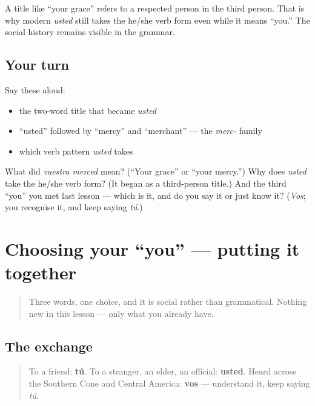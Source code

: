 \begin{culture}
A title like \textquotedblleft{}your grace\textquotedblright{} refers to a respected person in the third person. That is why modern \emph{usted} still takes the he/she verb form even while it means \textquotedblleft{}you.\textquotedblright{} The social history remains visible in the grammar.
\end{culture}

\subsection*{Your turn}
Say these aloud:

\begin{itemize}
\raggedright
  \item the two-word title that became \emph{usted}
  \item \textquotedblleft{}usted\textquotedblright{} followed by \textquotedblleft{}mercy\textquotedblright{} and \textquotedblleft{}merchant\textquotedblright{} — the \emph{merc-} family
  \item which verb pattern \emph{usted} takes
\end{itemize}

\begin{tcolorbox}[breakable,colback=teal!4,colframe=teal!35!black,title={Before you move on}]
What did \emph{vuestra merced} mean? (\textquotedblleft{}Your grace\textquotedblright{} or \textquotedblleft{}your mercy.\textquotedblright{}) Why does \emph{usted} take the he/she verb form? (It began as a third-person title.) And the third \textquotedblleft{}you\textquotedblright{} you met last lesson — which is it, and do you say it or just know it? (\emph{Vos}; you recognise it, and keep saying \emph{tú}.)
\end{tcolorbox}
\section[Practice]{Choosing your \textquotedblleft{}you\textquotedblright{} — putting it together}

\label{lesson:ES-C03-repaso-tu-usted}



\begin{quote}
Three words, one choice, and it is social rather than grammatical. Nothing new in this lesson — only what you already have.
\end{quote}

\subsection*{The exchange}
\begin{quote}
To a friend: \textbf{tú}. To a stranger, an elder, an official: \textbf{usted}. Heard across the Southern Cone and Central America: \textbf{vos} — understand it, keep saying \emph{tú}.
\end{quote}

